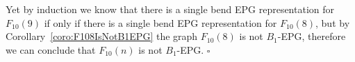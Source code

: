 \documentclass[9pt]{entcs}
\newtheorem{lema}[thm]{Lemma}%
\begin{document}
\begin{pf}
Yet by induction we know that there is a single bend EPG representation for $F_{10}(9)$ if only if there is a single bend EPG representation for $F_{10}(8)$, but by Corollary~\ref{coro:F108IsNotB1EPG} the graph $F_{10}(8)$ is not $B_1$-EPG, therefore we can conclude that $F_{10}(n)$ is not $B_1$-EPG.
 $\square$\end{pf} 


% 





% 

\end{document}
